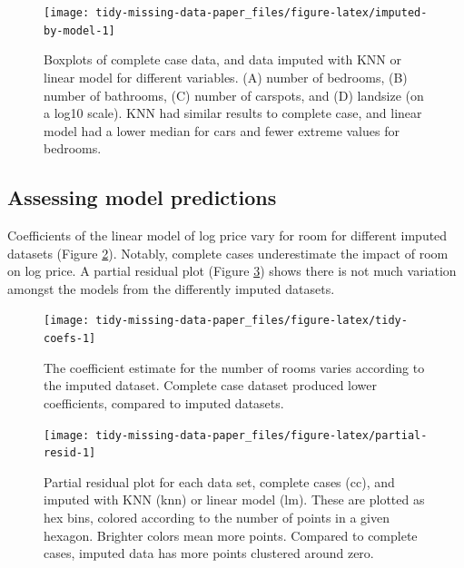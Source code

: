 \documentclass[
]{jss}
\begin{document}
\begin{CodeChunk}
\begin{figure}

{\centering \texttt{[image: tidy-missing-data-paper\_files/figure-latex/imputed-by-model-1]} 

}

\caption[Boxplots of complete case data, and data imputed with KNN or linear model for different variables]{Boxplots of complete case data, and data imputed with KNN or linear model for different variables. (A) number of bedrooms, (B) number of bathrooms, (C) number of carspots, and (D) landsize (on a log10 scale). KNN had similar results to complete case, and linear model had a lower median for cars and fewer extreme values for bedrooms.}\label{fig:imputed-by-model}
\end{figure}
\end{CodeChunk}

\hypertarget{case-study-assess-model}{%
\subsection{Assessing model predictions}\label{case-study-assess-model}}

Coefficients of the linear model of log price vary for room for different imputed datasets (Figure \ref{fig:tidy-coefs}). Notably, complete cases underestimate the impact of room on log price. A partial residual plot (Figure \ref{fig:partial-resid}) shows there is not much variation amongst the models from the differently imputed datasets.

\begin{CodeChunk}
\begin{figure}

{\centering \texttt{[image: tidy-missing-data-paper\_files/figure-latex/tidy-coefs-1]} 

}

\caption[The coefficient estimate for the number of rooms varies according to the imputed dataset]{The coefficient estimate for the number of rooms varies according to the imputed dataset. Complete case dataset produced lower coefficients, compared to imputed datasets.}\label{fig:tidy-coefs}
\end{figure}
\end{CodeChunk}

\begin{CodeChunk}
\begin{figure}

{\centering \texttt{[image: tidy-missing-data-paper\_files/figure-latex/partial-resid-1]} 

}

\caption[Partial residual plot for each data set, complete cases (cc), and imputed with KNN (knn) or linear model (lm)]{Partial residual plot for each data set, complete cases (cc), and imputed with KNN (knn) or linear model (lm). These are plotted as hex bins, colored according to the number of points in a given hexagon. Brighter colors mean more points. Compared to complete cases, imputed data has more points clustered around zero.}\label{fig:partial-resid}
\end{figure}
\end{CodeChunk}
\end{document}
